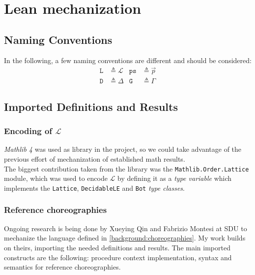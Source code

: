 \documentclass[12pt,a4paper,twoside]{book}
\newcommand{\MCL}{\mathscr{L}}
\begin{document}
\chapter{Lean mechanization}
\section{Naming Conventions}
In the following, a few naming conventions are different and should be considered:
\begin{align*}
\texttt{L} &\triangleq \MCL &\texttt{ps} &\triangleq \vec{p}\\
\texttt{D} &\triangleq \Delta & \texttt{G} &\triangleq \Gamma
\end{align*}

\section{Imported Definitions and Results}
\label{lean:imports}
\subsection{Encoding of $\MCL$}
\emph{Mathlib 4}\cite{mathlib4} was used as library in the project, so we could take advantage of the previous effort of mechanization of established math results.\\
The biggest contribution taken from the library was the \texttt{Mathlib.Order.Lattice} module, which was used to encode $\MCL$ by defining it as a \emph{type variable} which implements the \texttt{Lattice}, \texttt{DecidableLE} and \texttt{Bot} \emph{type classes}.
\subsection{Reference choreographies}
Ongoing research is being done by Xueying Qin and Fabrizio Montesi at SDU to mechanize the language defined in \ref{background:choreographies}.
My work builds on theirs, importing the needed definitions and results. The main imported constructs are the following: procedure context implementation, syntax and semantics for reference choreographies.
\end{document}
